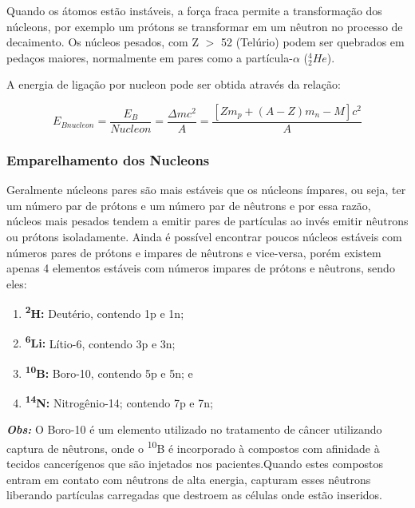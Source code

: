 \documentclass[11pt,a4paper]{article}
\newcounter{exemplo}
\begin{document}
    Quando os átomos estão instáveis, a força fraca permite a transformação dos núcleons, por exemplo um prótons se transformar em um nêutron no processo de decaimento. Os núcleos pesados, com Z $>$ 52  (Telúrio) podem ser quebrados em pedaços maiores, normalmente em pares como a partícula-$\alpha$ (${}_2^4He$).
                
    A energia de ligação por nucleon pode ser obtida através da relação:

    \begin{equation}
		E_{Bnucleon} = \frac{E_B}{Nucleon} = \frac{\Delta m c^2}{A} = \frac{\left[Zm_p + (A - Z)m_n - M\right]c^2}{A}
	\end{equation}                

\subsubsection*{Emparelhamento dos Nucleons}

    Geralmente núcleons pares são mais estáveis que os núcleons ímpares, ou seja, ter um número par de prótons e um número par de nêutrons e por essa razão, núcleos mais pesados tendem a emitir pares de partículas ao invés emitir nêutrons ou prótons isoladamente. Ainda é possível encontrar poucos núcleos estáveis com números pares de prótons e impares de nêutrons e vice-versa, porém existem apenas 4 elementos estáveis com números impares de prótons e nêutrons, sendo eles: 

    \begin{enumerate}
		\item \textbf{\textsuperscript{2}H:} Deutério, contendo 1p e 1n;
		\item \textbf{\textsuperscript{6}Li:} Lítio-6, contendo 3p e 3n;
		\item \textbf{\textsuperscript{10}B:} Boro-10, contendo 5p e 5n; e 
		\item \textbf{\textsuperscript{14}N:} Nitrogênio-14; contendo 7p e 7n;
	\end{enumerate}            

    \textbf{\textcolor{CarnationPink}{\textit{Obs:}}} O Boro-10 é um elemento utilizado no tratamento de câncer utilizando captura de nêutrons, onde o \textsuperscript{10}B é incorporado à compostos com afinidade à tecidos cancerígenos que são injetados nos pacientes.Quando estes compostos entram em contato com nêutrons de alta energia, capturam esses nêutrons liberando partículas carregadas que destroem as células onde estão inseridos.
\end{document}

